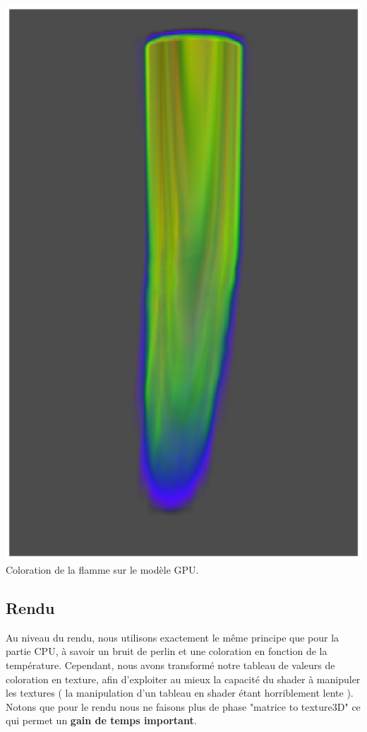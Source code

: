 \documentclass[a4paper,10pt]{article}
\begin{document}
    \begin{center}
	\includegraphics[scale=0.5]{GPU.ps}\\
	Coloration de la flamme sur le modèle GPU.
    \end{center}
 
 
\subsection{Rendu}
Au niveau du rendu, nous utilisons exactement le même principe que pour la partie CPU,
à savoir un bruit de perlin et une coloration en fonction de la température.
Cependant, nous avons transformé notre tableau de valeurs de coloration en texture,
afin d'exploiter au mieux la capacité du shader à manipuler les textures ( la manipulation
d'un tableau en shader étant horriblement lente ).
Notons que pour le rendu nous ne faisons plus de phase "matrice to texture3D" ce qui permet
un \textbf{gain de temps important}.
\end{document}
